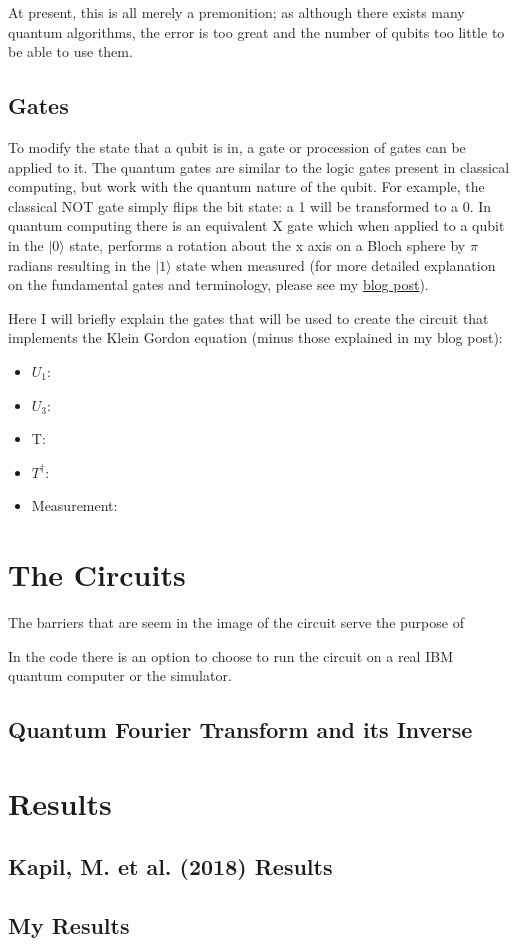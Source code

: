 \documentclass{article}
\begin{document}
At present, this is all merely a premonition; as although there exists many quantum algorithms, the error is too great and the number of qubits too little to be able to use them.

\subsection{Gates}
To modify the state that a qubit is in, a gate or procession of gates can be applied to it. The quantum gates are similar to the logic gates present in classical computing, but work with the quantum nature of the qubit. For example, the classical NOT gate simply flips the bit state: a 1 will be transformed to a 0. In quantum computing there is an equivalent X gate which when applied to a qubit in the $|0\rangle$ state, performs a rotation about the x axis on a Bloch sphere by $\pi$ radians resulting in the $|1\rangle$ state when measured (for more detailed explanation on the fundamental gates and terminology, please see my \href{https://desireevl.github.io/archive/2019/04/03/quantum-intro.html}{blog post}).

Here I will briefly explain the gates that will be used to create the circuit that implements the Klein Gordon equation (minus those explained in my blog post):

\begin{itemize}[labelindent=1.5em,labelsep=0.9cm,leftmargin=*]
	\item $U_1$:
	\item $U_3$:
	\item T:
	\item $T^\dagger$:
	\item Measurement: 
\end{itemize}


\section{The Circuits}
The barriers that are seem in the image of the circuit serve the purpose of

In the code there is an option to choose to run the circuit on a real IBM quantum computer or the simulator.
\subsection{Quantum Fourier Transform and its Inverse}


\section{Results}
\subsection{Kapil, M. et al. (2018) Results}

\subsection{My Results}




\end{document}
